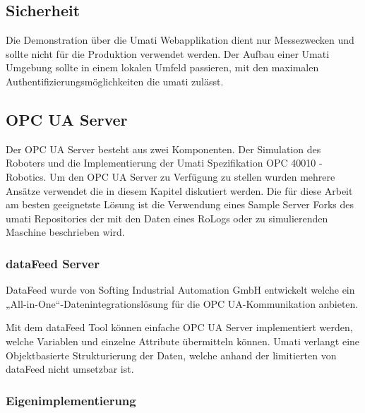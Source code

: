 \documentclass[a4paper, 12pt, oneside]{scrbook}
\begin{document}
		 
		\subsection{Sicherheit}
		
		Die Demonstration über die Umati Webapplikation dient nur Messezwecken und sollte nicht für die Produktion verwendet werden. Der Aufbau einer Umati Umgebung sollte in einem lokalen Umfeld passieren, mit den maximalen Authentifizierungsmöglichkeiten die umati zulässt. %
		
		\subsection{OPC UA Server}
			
		Der OPC UA Server besteht aus zwei Komponenten. Der Simulation des Roboters und die Implementierung der Umati Spezifikation OPC 40010 - Robotics. Um den OPC UA Server zu Verfügung zu stellen wurden mehrere Ansätze verwendet die in diesem Kapitel diskutiert werden. Die für diese Arbeit am besten geeignetste Lösung ist die Verwendung eines Sample Server Forks des umati Repositories der mit den Daten eines RoLogs oder zu simulierenden Maschine beschrieben wird. 
		
			\subsubsection{dataFeed Server}
			
			DataFeed wurde von Softing Industrial Automation GmbH entwickelt welche ein „All-in-One“-Datenintegrationslösung für die OPC UA-Kommunikation anbieten.
			
			Mit dem dataFeed Tool können einfache OPC UA Server implementiert werden, welche Variablen und einzelne Attribute übermitteln können. Umati verlangt eine  Objektbasierte Strukturierung der Daten, welche anhand der limitierten von dataFeed nicht umsetzbar ist.
			
			\subsubsection{Eigenimplementierung}
			
			
			
			
			
\end{document}
